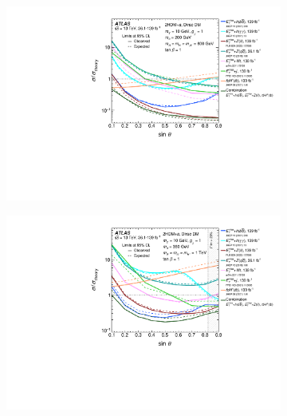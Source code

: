 \begin{figure}[h!]
    \centering
    \begin{subfigure}[2]{0.495\textwidth}
        \centering
        \includegraphics[width=\linewidth]{figures/fig_07a.pdf}
        \caption{}
        \label{fig:result-sint-scan-a}
    \end{subfigure}
    \begin{subfigure}[2]{0.495\textwidth}
        \centering
        \includegraphics[width=\linewidth]{figures/fig_07b.pdf}
        \caption{}
        \label{fig:result-sint-scan-b}
    \end{subfigure}
    \begin{subfigure}[2]{0.495\textwidth}
        \centering

\end{subfigure}
\end{figure}
